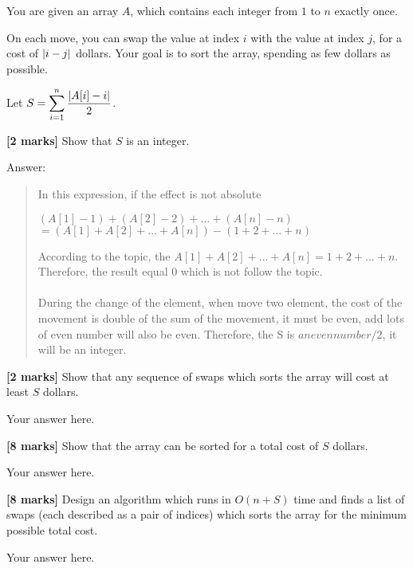 \documentclass{article}
\begin{document}
\setcounter{question}{3}

\begin{Question}
You are given an array $A$, which contains each integer from $1$ to $n$ exactly once.

On each move, you can swap the value at index $i$ with the value at index $j$, for a cost of $\abs{i-j}$ dollars. Your goal is to sort the array, spending as few dollars as possible.

Let $S = \displaystyle \sum_{i=1}^n \frac{\abs*{A[i]-i}}{2}$.

\begin{Subquestion}
\textbf{[2 marks]} Show that $S$ is an integer.

\begin{answer}
Answer:
\begin{quote}
    In this expression, if the effect is not absolute
    \begin{center}
        $(A[1]- 1) + (A[2]-2) + ... + (A[n] - n)$\\
        $ = (A[1] + A[2] + ... + A[n]) - (1 + 2 + ... + n)$\\  
    \end{center}
    According to the topic, the $A[1] + A[2] + ... + A[n] = 1 + 2 + ... + n$. Therefore, the result equal 0 which is not follow the topic.\\\\
    During the change of the element, when move two element, the cost of the movement is double of the sum of the movement, it must be even, add lots of even number will also be even. Therefore, the S is $an even number / 2 $, it will be an integer.\\
\end{quote}
\end{answer}
\end{Subquestion}

\begin{Subquestion}
\textbf{[2 marks]} Show that any sequence of swaps which sorts the array will cost at least $S$ dollars.

\begin{answer}
Your answer here.    
\end{answer}
\end{Subquestion}

\begin{Subquestion}
\textbf{[8 marks]} Show that the array can be sorted for a total cost of $S$ dollars.

\begin{answer}
Your answer here.
\end{answer}
\end{Subquestion}

\begin{Subquestion}
\textbf{[8 marks]} Design an algorithm which runs in $O(n+S)$ time and finds a list of swaps (each described as a pair of indices) which sorts the array for the minimum possible total cost.

\begin{answer}
Your answer here.
\end{answer}
\end{Subquestion}
\end{Question}
\end{document}
